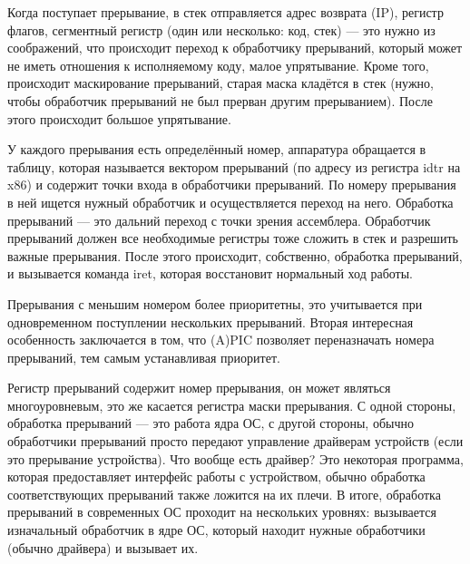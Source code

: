 \documentclass[main]{subfiles}
\begin{document}
Когда поступает прерывание, в стек отправляется адрес возврата (IP),
регистр флагов, сегментный регистр (один или несколько: код, стек) --- это
нужно из соображений, что происходит переход к обработчику прерываний,
который может не иметь отношения к исполняемому коду, малое упрятывание.
Кроме того, происходит маскирование прерываний, старая маска кладётся в стек
(нужно, чтобы обработчик прерываний не был прерван другим прерыванием).
После этого происходит большое упрятывание.

У каждого прерывания есть определённый номер, аппаратура обращается в таблицу,
которая называется вектором прерываний (по адресу из регистра idtr на x86) и
содержит точки входа в обработчики прерываний. По номеру прерывания в ней
ищется нужный обработчик и осуществляется переход на него. Обработка прерываний ---
это дальний переход с точки зрения ассемблера. Обработчик прерываний должен
все необходимые регистры тоже сложить в стек и разрешить важные прерывания.
После этого происходит, собственно, обработка прерываний, и вызывается команда
iret, которая восстановит нормальный ход работы.

Прерывания с меньшим номером более приоритетны, это учитывается при одновременном
поступлении нескольких прерываний.
Вторая интересная особенность заключается в том, что (A)PIC позволяет
переназначать номера прерываний, тем самым устанавливая приоритет.

Регистр прерываний содержит номер прерывания, он может являться
многоуровневым, это же касается регистра маски прерывания.
С одной стороны, обработка прерываний --- это работа ядра ОС, с другой стороны,
обычно обработчики прерываний просто передают управление драйверам устройств
(если это прерывание устройства).
Что вообще есть драйвер? Это некоторая программа, которая предоставляет
интерфейс работы с устройством, обычно обработка соответствующих прерываний
также ложится на их плечи. В итоге, обработка прерываний в современных ОС
проходит на нескольких уровнях: вызывается изначальный обработчик в ядре ОС,
который находит нужные обработчики (обычно драйвера) и вызывает их.
\end{document}
